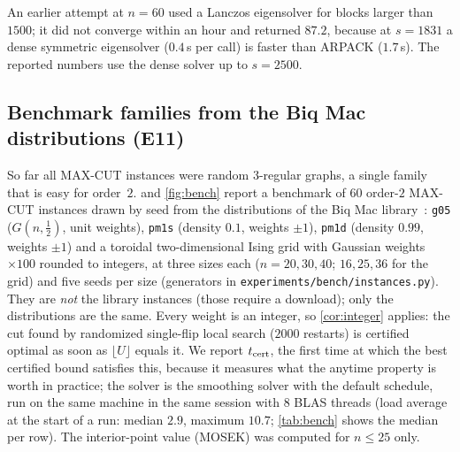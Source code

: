 \documentclass[a4paper,11pt]{article}
\newcommand{\fitbox}[1]{\sbox{\tabbox}{#1}\ifdim\wd\tabbox>\textwidth\resizebox{\textwidth}{!}{\usebox{\tabbox}}\else\usebox{\tabbox}\fi}
\theoremstyle{plain}
\theoremstyle{definition}
\theoremstyle{remark}
\begin{document}
An earlier attempt at $n=60$ used a Lanczos eigensolver for blocks larger than $1500$; it did not converge within an hour and returned $87.2$, because at $s=1831$ a dense symmetric eigensolver ($0.4$\,s per call) is faster than ARPACK ($1.7$\,s). The reported numbers use the dense solver up to $s=2500$.

\subsection{Benchmark families from the Biq Mac distributions (E11)}\label{sec:bench}
So far all MAX-CUT instances were random $3$-regular graphs, a single family that is easy for order~$2$.  and \cref{fig:bench} report a benchmark of $60$ order-$2$ MAX-CUT instances drawn by seed from the distributions of the Biq Mac library~\cite{wiegele2007}: \texttt{g05} ($G(n,\tfrac12)$, unit weights), \texttt{pm1s} (density $0.1$, weights $\pm1$), \texttt{pm1d} (density $0.99$, weights $\pm1$) and a toroidal two-dimensional Ising grid with Gaussian weights $\times100$ rounded to integers, at three sizes each ($n=20,30,40$; $16,25,36$ for the grid) and five seeds per size (generators in \texttt{experiments/bench/instances.py}). They are \emph{not} the library instances (those require a download); only the distributions are the same. Every weight is an integer, so \cref{cor:integer} applies: the cut found by randomized single-flip local search ($2000$ restarts) is certified optimal as soon as $\lfloor U\rfloor$ equals it. We report $t_{\rm cert}$, the first time at which the best certified bound satisfies this, because it measures what the anytime property is worth in practice; the solver is the smoothing solver with the default schedule, run on the same machine in the same session with $8$ BLAS threads (load average at the start of a run: median $2.9$, maximum $10.7$; \cref{tab:bench} shows the median per row). The interior-point value (MOSEK) was computed for $n\le25$ only.
\begin{table}[t]\centering\scriptsize
\setlength{\tabcolsep}{3pt}
\fitbox{}
\caption{Order-$2$ MAX-CUT on instances drawn from the Biq Mac distributions, five seeds per row. ``cert./runs'': runs whose best cut equals $\lfloor U\rfloor$ at the end; $t_{\rm cert}$: time until $\lfloor U\rfloor$ first equals the best cut (median, minimum and maximum over the seeds); wall and CPU: median total times of the run (smoothing schedule exhausted); ``IPM wall'': median wall-clock time of MOSEK on the same moment model ($n\le25$). ``load'': median load average at the start of the run (the machine is shared).}\label{tab:bench}
\end{table}
\end{document}
